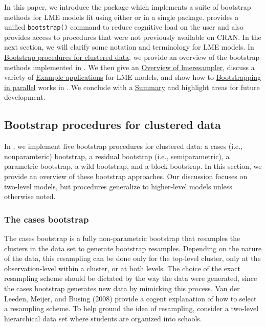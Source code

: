 In this paper, we introduce the  package which implements a suite of bootstrap methods for LME models fit using either  or  in a single package.  provides a unified \texttt{bootstrap()} command to reduce cognitive load on the user and also provides access to procedures that were not previously available on CRAN. In the next section, we will clarify some notation and terminology for LME models. In \protect\hyperlink{bootstrap-procedures-for-clustered-data}{Bootstrap procedures for clustered data}, we provide an overview of the bootstrap methods implemented in . We then give an \protect\hyperlink{overview-of-lmeresampler}{Overview of lmeresampler}, discuss a variety of \protect\hyperlink{example-applications}{Example applications} for LME models, and show how to \protect\hyperlink{bootstrapping-in-parallel}{Bootstrapping in parallel} works in . We conclude with a \protect\hyperlink{summary}{Summary} and highlight areas for future development.

\hypertarget{bootstrap-procedures-for-clustered-data}{%
\subsection{Bootstrap procedures for clustered data}\label{bootstrap-procedures-for-clustered-data}}

In , we implement five bootstrap procedures for clustered data: a cases
(i.e., nonparamteric) bootstrap, a residual bootstrap (i.e., semiparametric), a parametric
bootstrap, a wild bootstrap, and a block bootstrap. In this section,
we provide an overview of these bootstrap approaches. Our discussion
focuses on two-level models, but procedures generalize to
higher-level models unless otherwise noted.

\hypertarget{the-cases-bootstrap}{%
\subsubsection{The cases bootstrap}\label{the-cases-bootstrap}}

The cases bootstrap is a fully non-parametric bootstrap that resamples
the clusters in the data set to generate bootstrap
resamples. Depending on the nature of the data, this resampling can be
done only for the top-level cluster, only at the observation-level
within a cluster, or at both levels. The choice of the exact resampling
scheme should be dictated by the way the data were generated, since the
cases bootstrap generates new data by mimicking this process.
Van der Leeden, Meijer, and Busing (2008) provide a cogent explanation of how to select a
resampling scheme. To help ground the idea of resampling, consider a two-level
hierarchical data set where students are organized into schools.

